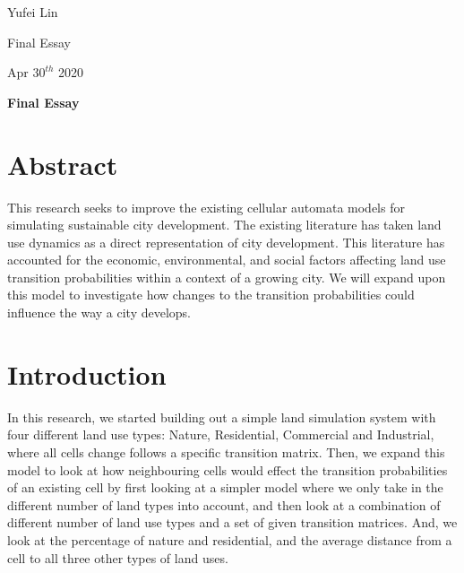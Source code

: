 \documentclass[a4paper,12pt]{report}
\begin{document}
\noindent
Yufei Lin

\noindent
Final Essay

\noindent
Apr \(30^{th}\) 2020

\begin{center}
\textbf{Final Essay}
\end{center}

\section{Abstract}

This research seeks to improve the existing cellular automata models for simulating sustainable city development. The existing literature has taken land use dynamics as a direct representation of city development. This literature has accounted for the economic, environmental, and social factors affecting land use transition probabilities within a context of a growing city. We will expand upon this model to investigate how changes to the transition probabilities could influence the way a city develops. 

\section{Introduction}

In this research, we started building out a simple land simulation system with four different land use types: Nature, Residential, Commercial and Industrial, where all cells change follows a specific transition matrix. Then, we expand this model to look at how neighbouring cells would effect the transition probabilities of an existing cell by first looking at a simpler model where we only take in the different number of land types into account, and then look at a combination of different number of land use types and a set of given transition matrices. And, we look at the percentage of nature and residential, and the average distance from a cell to all three other types of land uses.  
\end{document}
